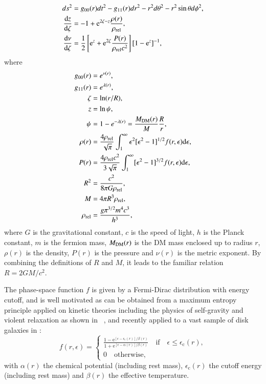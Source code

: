 \documentclass[twocolumn]{aa}
\begin{document}
\begin{align}
   \label{sode}
   ds^2 &= g_{00}(r)dt^2 - g_{11}(r)dr^2 -r^2d\theta^2 -r^2\sin\theta d\phi^2, \\
   \frac{\mathrm{d}z}{\mathrm{d}\zeta} & = -1+\mathrm{e}^{2\zeta-z}\frac{\rho(r)}{\rho_{\rm{rel}}},\\
   \frac{\mathrm{d}\nu}{\mathrm{d}\zeta} & = \frac{1}{2}\left[\mathrm{e}^{z}+\mathrm{e}^{2\zeta}\frac{P(r)}{\rho_{\rm{rel}}c^2}\right][1-\mathrm{e}^{z}]^{-1},
    \label{sode2}
\end{align}
where
\begin{align}
   g_{00}(r) &= e^{\nu(r)},\\
   g_{11}(r) &= e^{\lambda(r)},\\
   \zeta &= \ln(r/R),\\
   z &=\ln\psi,\\
   \psi &= 1-e^{-\lambda(r)} = \frac{M_{\rm{DM}}(r)}{M}\frac{R}{r},\label{mass_dm}\\
   \rho(r)&=\frac{4\rho_{\rm rel}}{\sqrt{\pi}}\int^\infty_1\epsilon^2[\epsilon^2-1]^{1/2}f(r,\epsilon)\mathrm{d}\epsilon,\\
   P(r)&=\frac{4\rho_{\rm rel}c^2}{3\sqrt{\pi}}\int^\infty_1[\epsilon^2-1]^{3/2}f(r,\epsilon)\mathrm{d}\epsilon,\\
   R^2 &= \frac{c^2}{8\pi G \rho_{\rm{rel}}},\\
   M &= 4\pi R^3 \rho_{\rm{rel}},\\
   \rho_{\rm{rel}}&= \frac{ g\pi^{3/2} m^4 c^3}{h^3},
\end{align}
where $G$ is the gravitational constant, $c$ is the speed of light, $h$ is the Planck constant, $m$ is the fermion mass, $M_{\rm{DM}}(r)$ is the DM mass enclosed up to radius $r$, $\rho(r)$ is the density, $P(r)$ is the pressure and $\nu(r)$ is the metric exponent. By combining the definitions of $R$ and $M$, it leads to the familiar relation $R=2GM/c^2$.

The phase-space function $f$ is given by a Fermi-Dirac distribution with energy cutoff, and is well motivated as can be obtained from a maximum entropy principle applied on kinetic theories including the physics of self-gravity and violent relaxation as shown in \citealp{2004PhyA..332...89C}~\citep[for a review see also][]{2022PhyA..60628089C}, and recently applied to a vast sample of disk galaxies in \cite{2023ApJ...945....1K}:
\begin{equation}
f(r,\epsilon)=
   \begin{cases}
      \frac{\displaystyle{1-\mathrm {e}^{[\epsilon-\epsilon_\mathrm{c}(r)]/\beta(r)}}}
      {\displaystyle{1+\mathrm {e}^{[\epsilon-\alpha(r)]/\beta(r)}}}\quad\mathrm{if}\quad \epsilon \leq \epsilon_\mathrm{c}(r),\\
      0\quad \mathrm{otherwise},
   \end{cases}
\end{equation}
with $\alpha(r)$ the chemical potential (including rest mass), $\epsilon_\mathrm{c}(r)$ the cutoff
energy (including rest mass) and $\beta(r)$ the effective temperature.
\end{document}
